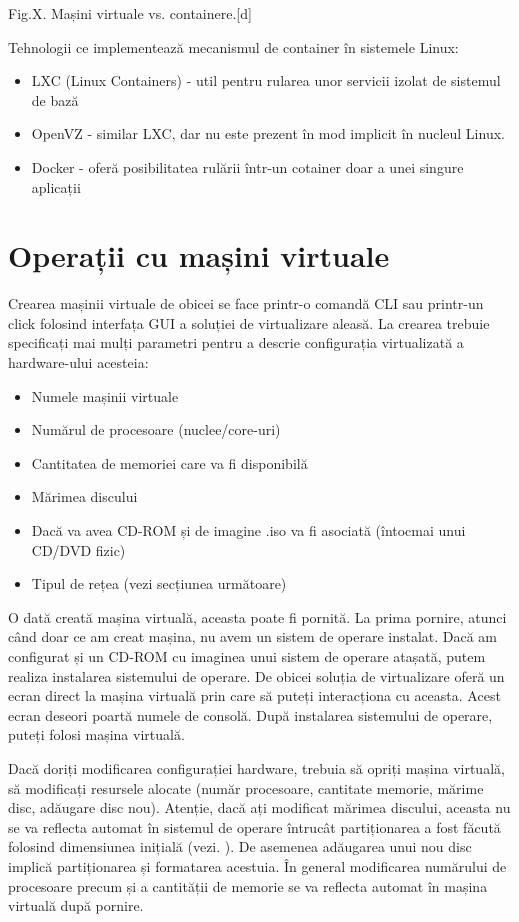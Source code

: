 Fig.X. Mașini virtuale vs. containere.[d]

Tehnologii ce implementează mecanismul de container în sistemele Linux:

\begin{itemize}
	\item LXC  (Linux Containers) - util pentru
		rularea unor servicii izolat de sistemul de bază
	\item OpenVZ - similar LXC, dar nu este prezent în mod implicit în
		nucleul Linux.
	\item Docker - oferă posibilitatea rulării într-un cotainer doar a unei
		singure aplicații
\end{itemize}

\section{Operații cu mașini virtuale}
\label{sec:vm-ops}

Crearea mașinii virtuale de obicei se face printr-o comandă CLI sau printr-un
click folosind interfața GUI a soluției de virtualizare aleasă. La crearea
trebuie specificați mai mulți parametri pentru a descrie configurația
virtualizată a hardware-ului acesteia:

\begin{itemize}
	\item Numele mașinii virtuale
	\item Numărul de procesoare (nuclee/core-uri)
	\item Cantitatea de memoriei care va fi disponibilă
	\item Mărimea discului
	\item Dacă va avea CD-ROM și de imagine .iso va fi asociată (întocmai
		unui CD/DVD fizic)
	\item Tipul de rețea (vezi secțiunea următoare)
\end{itemize}

O dată creată mașina virtuală, aceasta poate fi pornită. La prima pornire,
atunci când doar ce am creat mașina, nu avem un sistem de operare instalat. Dacă
am configurat și un CD-ROM cu imaginea unui sistem de operare atașată, putem
realiza instalarea sistemului de operare. De obicei soluția de virtualizare
oferă un ecran direct la mașina virtuală prin care să puteți interacționa cu
aceasta. Acest ecran deseori poartă numele de consolă. După instalarea
sistemului de operare, puteți folosi mașina virtuală.

Dacă doriți modificarea configurației hardware, trebuia să opriți mașina
virtuală, să modificați resursele alocate (număr procesoare, cantitate memorie,
mărime disc, adăugare disc nou). Atenție, dacă ați modificat mărimea discului,
aceasta nu se va reflecta automat în sistemul de operare întrucât partiționarea
a fost făcută folosind dimensiunea inițială (vezi.
). De asemenea adăugarea unui nou disc
implică partiționarea și formatarea acestuia. În general modificarea numărului
de procesoare precum și a cantității de memorie se va reflecta automat în mașina
virtuală după pornire.

